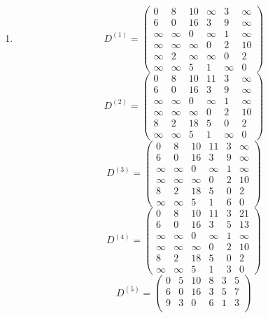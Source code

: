 \documentclass[12pt,a4paper]{article}
\begin{document}
\begin{enumerate}[label=(\alph*)]
		\item
		\[
			D^{(1)} =
			\begin{pmatrix}
				0 & 8 & 10 & \infty & 3 & \infty \\
				6 & 0 & 16 & 3 & 9 & \infty \\
				\infty & \infty & 0 & \infty & 1 & \infty \\
				\infty & \infty & \infty & 0 & 2 & 10 \\
				\infty & 2 & \infty & \infty & 0 & 2 \\
				\infty & \infty & 5 & 1 & \infty & 0
			\end{pmatrix}
		\]
		\[
			D^{(2)} =
			\begin{pmatrix}
				0 & 8 & 10 & 11 & 3 & \infty \\
				6 & 0 & 16 & 3 & 9 & \infty \\
				\infty & \infty & 0 & \infty & 1 & \infty \\
				\infty & \infty & \infty & 0 & 2 & 10 \\
				8 & 2 & 18 & 5 & 0 & 2 \\
				\infty & \infty & 5 & 1 & \infty & 0
			\end{pmatrix}
		\]
		\[
			D^{(3)} =
			\begin{pmatrix}
				0 & 8 & 10 & 11 & 3 & \infty \\
				6 & 0 & 16 & 3 & 9 & \infty \\
				\infty & \infty & 0 & \infty & 1 & \infty \\
				\infty & \infty & \infty & 0 & 2 & 10 \\
				8 & 2 & 18 & 5 & 0 & 2 \\
				\infty & \infty & 5 & 1 & 6 & 0
			\end{pmatrix}
		\]
		\[
			D^{(4)} =
			\begin{pmatrix}
				0 & 8 & 10 & 11 & 3 & 21 \\
				6 & 0 & 16 & 3 & 5 & 13 \\
				\infty & \infty & 0 & \infty & 1 & \infty \\
				\infty & \infty & \infty & 0 & 2 & 10 \\
				8 & 2 & 18 & 5 & 0 & 2 \\
				\infty & \infty & 5 & 1 & 3 & 0
			\end{pmatrix}
		\]
		\[
			D^{(5)} =
			\begin{pmatrix}
				0 & 5 & 10 & 8 & 3 & 5 \\
				6 & 0 & 16 & 3 & 5 & 7 \\
				9 & 3 & 0 & 6 & 1 & 3 \\

\end{pmatrix}\]
\end{enumerate}
\end{document}
